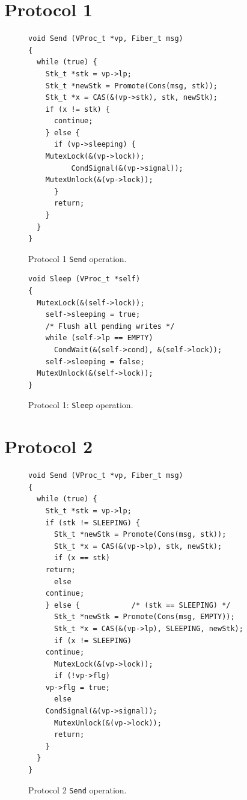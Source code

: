 \documentclass[11pt]{article}
\begin{document}
\section{Protocol 1}\label{sec:protocol1}

\begin{figure}
\lstset{language=C}
\lstset{commentstyle=\textit}
\lstset{numbers=left}
\begin{lstlisting}
void Send (VProc_t *vp, Fiber_t msg)
{
  while (true) {
    Stk_t *stk = vp->lp;
    Stk_t *newStk = Promote(Cons(msg, stk));
    Stk_t *x = CAS(&(vp->stk), stk, newStk);
    if (x != stk) {
      continue;
    } else {
      if (vp->sleeping) {
	MutexLock(&(vp->lock));
          CondSignal(&(vp->signal));
	MutexUnlock(&(vp->lock));
      }
      return;
    }
  }
}
\end{lstlisting}
\caption{Protocol 1 \texttt{Send} operation.}
\end{figure}

\begin{figure}
\lstset{language=C}
\lstset{commentstyle=\textit}
\lstset{numbers=left}
\begin{lstlisting}
void Sleep (VProc_t *self)
{
  MutexLock(&(self->lock));
    self->sleeping = true;
    /* Flush all pending writes */
    while (self->lp == EMPTY)
      CondWait(&(self->cond), &(self->lock));
    self->sleeping = false;
  MutexUnlock(&(self->lock));
}
\end{lstlisting}
\caption{Protocol 1: \texttt{Sleep} operation.}
\end{figure}

\section{Protocol 2}\label{sec:protocol2}

\begin{figure}
\lstset{language=C}
\lstset{commentstyle=\textit}
\lstset{numbers=left}
\begin{lstlisting}
void Send (VProc_t *vp, Fiber_t msg)
{
  while (true) {
    Stk_t *stk = vp->lp;
    if (stk != SLEEPING) {
      Stk_t *newStk = Promote(Cons(msg, stk));
      Stk_t *x = CAS(&(vp->lp), stk, newStk);
      if (x == stk)
	return;
      else
	continue;
    } else {            /* (stk == SLEEPING) */
      Stk_t *newStk = Promote(Cons(msg, EMPTY));
      Stk_t *x = CAS(&(vp->lp), SLEEPING, newStk);
      if (x != SLEEPING)
	continue;
      MutexLock(&(vp->lock));
      if (!vp->flg)
	vp->flg = true;
      else
	CondSignal(&(vp->signal));
      MutexUnlock(&(vp->lock));
      return;
    }
  }
}
\end{lstlisting}
\caption{Protocol 2 \texttt{Send} operation.}
\end{figure}
\end{document}

